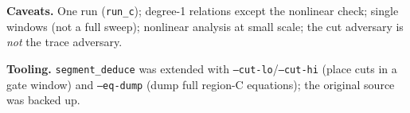 \documentclass[11pt]{article}
\newcommand{\code}[1]{\texttt{#1}}
\begin{document}
\noindent\textbf{Caveats.} One run (\code{run\_c}); degree-1 relations except the
nonlinear check; single windows (not a full sweep); nonlinear analysis at small
scale; the cut adversary is \emph{not} the trace adversary.

\noindent\textbf{Tooling.} \code{segment\_deduce} was extended with
\code{--cut-lo}/\code{--cut-hi} (place cuts in a gate window) and \code{--eq-dump}
(dump full region-C equations); the original source was backed up.
\end{document}
